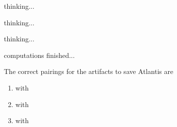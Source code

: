 \documentclass[white]{guildcamp3}
\begin{document}
\name{\wEndWorldFour{}} %

thinking...

thinking...

thinking...

computations finished...

The correct pairings for the artifacts to save Atlantis are

\begin{enumerate}
	\item \iMagicArtifactOne{} with \iTechArtifactTwo{}

	\item \iMagicArtifactTwo{} with \iTechArtifactThree{}

	\item \iMagicArtifactThree{} with \iTechArtifactOne{}
\end{enumerate}

\end{document}
